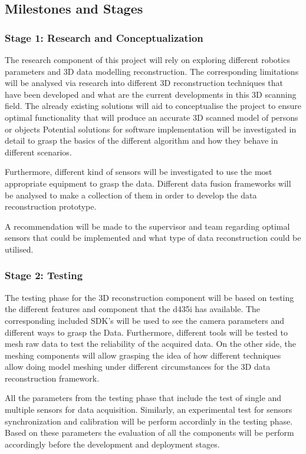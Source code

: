 \documentclass[12pt]{report}
\begin{document}
\subsection{Milestones and Stages}
\subsubsection{ Stage 1: Research and Conceptualization }
The research component of this project will rely on exploring different robotics parameters and 3D data modelling reconstruction. 
The corresponding limitations will be analysed via research into different 3D reconstruction techniques that have been developed and what are the current developments in this 3D scanning field. 
The already existing solutions will aid to conceptualise the project to ensure optimal functionality that will produce an accurate 3D scanned model of persons or objects
Potential solutions for software implementation will be investigated in detail to grasp the basics of the different algorithm and how they behave in different scenarios. 

Furthermore, different kind of sensors will be investigated to use the most appropriate equipment to grasp the data. Different data fusion frameworks will be analysed to make a collection of them in order to develop the data reconstruction prototype. 

A recommendation will be made to the supervisor and team regarding optimal sensors that could be implemented and what type of data reconstruction could be utilised. 
\enlargethispage{\baselineskip}

\subsubsection{Stage 2: Testing}
The testing phase for the 3D reconstruction component will be based on testing the different features and component that the d435i has available. The corresponding included SDK’s will be used to see the camera parameters and different ways to grasp the Data. 
Furthermore, different tools will be tested to mesh raw data to test the reliability of the acquired data. 
On the other side, the meshing components will allow grasping the idea of how different techniques allow doing model meshing under different circumstances for the 3D data reconstruction framework. 

All the parameters from the testing phase that include the test of single and multiple sensors for data acquisition. Similarly, an experimental test for sensors synchronization and calibration will be perform accordinly in the testing phase. 
Based on these parameters the evaluation of all the components will be perform accordingly before the development and deployment stages.
\end{document}
